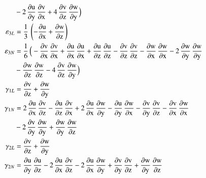 \begin{subequations}
\begin{align}
	\mbox{} & - 2 \, \mathrm{\frac{\partial u}{\partial y}}\, \mathrm{\frac{\partial v}{\partial x}} + 4 \, \mathrm{\frac{\partial v}{\partial z}}\, \mathrm{\frac{\partial w}{\partial y}}\Big)\\
	\mathrm \varepsilon_{3L} & = \frac{1}{3} \, \left(-\mathrm{\frac{\partial u}{\partial x}} + \mathrm{\frac{\partial w}{\partial z}}\right)\\
	\mathrm \varepsilon_{3N} & = \frac{1}{6} \, \Big(- \mathrm{\frac{\partial v}{\partial x}}\, \mathrm{\frac{\partial v}{\partial x}} + \mathrm{\frac{ \partial u}{\partial x}}\, \mathrm{\frac{ \partial u}{\partial x}} + \mathrm{\frac{\partial u}{\partial z}}\, \mathrm{\frac{\partial u}{\partial z}} - \mathrm{\frac{\partial v}{\partial z}}\, \mathrm{\frac{\partial v}{\partial z}} - \mathrm{\frac{\partial w}{\partial x}}\, \mathrm{\frac{\partial w}{\partial x}} - 2 \,  \mathrm{\frac{\partial w}{\partial y}}\, \mathrm{\frac{\partial w}{\partial y}} \notag \\
	\mbox{} & -  \mathrm{\frac{\partial w}{\partial z}}\, \mathrm{\frac{\partial w}{\partial z}} - 4 \, \mathrm{\frac{\partial v}{\partial z}}\, \mathrm{\frac{\partial w}{\partial y}}\Big)\\
		\mathrm \gamma_{1L} & = \mathrm{\frac{\partial v}{\partial z}} + \mathrm{\frac{\partial w}{\partial y}}\\
	\mathrm \gamma_{1N} & = 2 \, \mathrm{\frac{\partial u}{\partial x}}\, \mathrm{\frac{\partial v}{\partial z}} - \mathrm{\frac{ \partial u}{\partial z}}\, \mathrm{\frac{ \partial v}{\partial x}} + 2 \, \mathrm{\frac{\partial u}{\partial x}}\, \mathrm{\frac{\partial w}{\partial y}} - \mathrm{\frac{\partial u}{\partial y}}\, \mathrm{\frac{\partial w}{\partial x}} - \mathrm{\frac{\partial v}{\partial y}}\, \mathrm{\frac{\partial v}{\partial z}} -   \mathrm{\frac{\partial v}{\partial x}}\, \mathrm{\frac{\partial w}{\partial x}} \notag \\
	\mbox{} & - 2 \, \mathrm{\frac{\partial v}{\partial y}}\, \mathrm{\frac{\partial w}{\partial y}} + \mathrm{\frac{\partial w}{\partial y}}\, \mathrm{\frac{\partial w}{\partial z}}\\
	\mathrm \gamma_{2L} & = \mathrm{\frac{\partial v}{\partial z}} + \mathrm{\frac{\partial w}{\partial y}}\\
    \mathrm \gamma_{2N} & = \mathrm{\frac{\partial u}{\partial y}}\, \mathrm{\frac{\partial u}{\partial z}} - 2 \, \mathrm{\frac{ \partial u}{\partial x}}\, \mathrm{\frac{ \partial v}{\partial z}} - 2 \, \mathrm{\frac{\partial u}{\partial x}}\, \mathrm{\frac{\partial w}{\partial y}} + \mathrm{\frac{\partial v}{\partial y}}\, \mathrm{\frac{\partial v}{\partial z}} + \mathrm{\frac{\partial w}{\partial y}}\, \mathrm{\frac{\partial w}{\partial z}}\\

\end{align}
\end{subequations}
